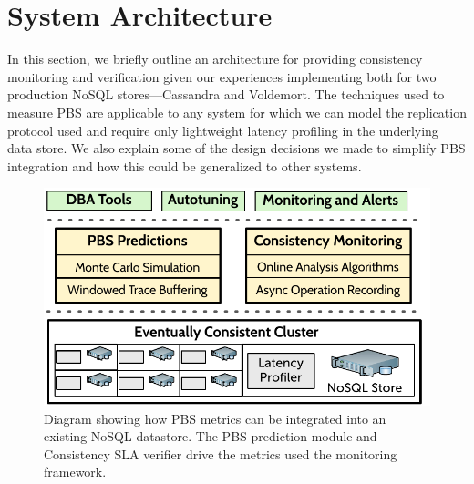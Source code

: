 \section{System Architecture}
\label{sec:architecture}

In this section, we briefly outline an architecture for providing
consistency monitoring and verification given our experiences
implementing both for two production NoSQL stores---Cassandra and
Voldemort. The techniques used to measure PBS are applicable to any
system for which we can model the replication protocol used and
require only lightweight latency profiling in the underlying data
store. We also explain some of the design decisions we made to
simplify PBS integration and how this could be generalized to other
systems.


\begin{figure}
\centering
\includegraphics[width=\columnwidth]{figs/cluster-arch.pdf}
\caption{Diagram showing how PBS metrics can be integrated into an existing
NoSQL datastore. The PBS prediction module and Consistency SLA verifier drive
the metrics used the monitoring framework.}
\label{fig:pbs-sys-arch}
\end{figure}

